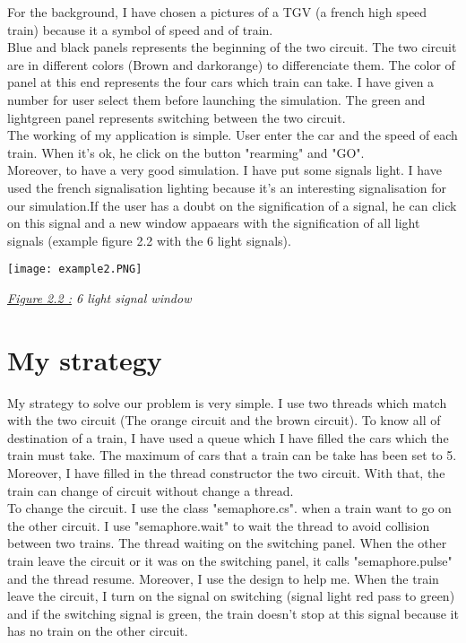 \documentclass[12pt]{article}
\begin{document}
For the background, I have chosen a pictures of a TGV (a french high speed train) because it a symbol of speed and of train.\\
Blue and black panels represents the beginning of the two circuit. The two circuit are in different colors (Brown and darkorange) to differenciate them. The color of panel at this end represents the four cars which train can take. I have given a number for user select them before launching the simulation.
The green and lightgreen panel represents switching between the two circuit.\\
The working of my application is simple. User enter the car and the speed of each train. When it's ok, he click on the button "rearming" and "GO".\\
Moreover, to have a very good simulation. I have put some signals light. I have used the french signalisation lighting because it's an interesting signalisation for our simulation.If the user has a doubt on the signification of a signal, he can click on this signal and a new window appaears with the signification of all light signals (example figure 2.2 with the 6 light signals).\\
\begin{center}

\texttt{[image: example2.PNG]}

\quad

\textit{\underline{Figure 2.2 :} 6 light signal window}
\end{center}

\newpage

\section{My strategy}

\quad

My strategy to solve our problem is very simple. I use two threads which match with the two circuit (The orange circuit and the brown circuit).
To know all of destination of a train, I have used a queue which I have filled the cars which the train must take. The maximum of cars that a train can be take has been set to 5.
Moreover, I have filled in the thread constructor the two circuit. With that, the train can change of circuit without change a thread.\\

To change the circuit. I use the class "semaphore.cs". when a train want to go on the other circuit. I use "semaphore.wait" to wait the thread to avoid collision between two trains. The thread waiting on the switching panel. When the other train leave the circuit or it was on the switching panel, it calls "semaphore.pulse" and the thread resume.
Moreover, I use the design to help me. When the train leave the circuit, I turn on the signal on switching (signal light red pass to green) and if the switching signal is green, the train doesn't stop at this signal because it has no train on the other circuit.\\
\end{document}
